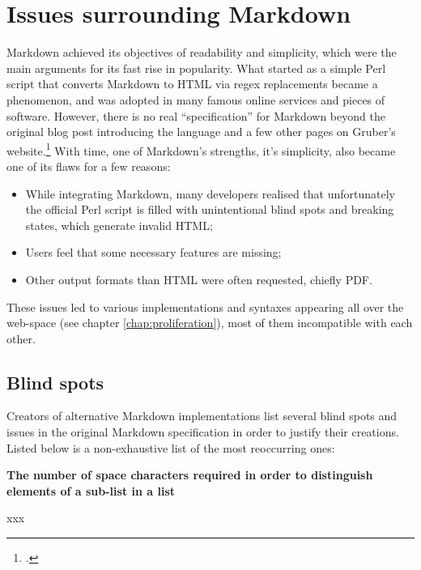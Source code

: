 \chapter{Issues surrounding Markdown}
\label{chap:issues}

\vspace{1cm}

Markdown achieved its objectives of readability and simplicity, which were the main arguments for its fast rise in popularity.
What started as a simple Perl script that converts Markdown to HTML via regex replacements became a phenomenon, and was adopted in many
famous online services and pieces of software. However, there is no real ``specification'' for Markdown beyond the original blog post
introducing the language and a few other pages on Gruber's website.\footcite{gruber2004markdown}
With time, one of Markdown's strengths, it's simplicity, also became one of its flaws for a few reasons:

\begin{itemize}
    \item While integrating Markdown, many developers realised that unfortunately the official Perl script is filled with unintentional
    blind spots and breaking states, which generate invalid HTML;
    \item Users feel that some necessary features are missing;
    \item Other output formats than HTML were often requested, chiefly PDF.
\end{itemize}

These issues led to various implementations and syntaxes appearing all over the web-space (see chapter \ref{chap:proliferation}),
most of them incompatible with each other.

\section{Blind spots}

Creators of alternative Markdown implementations list several blind spots and issues in the original Markdown specification in order to
justify their creations. Listed below is a non-exhaustive list of the most reoccurring ones:\newline

\textbf{The number of space characters required in order to distinguish elements of a sub-list in a list}\newline

xxx\newline

